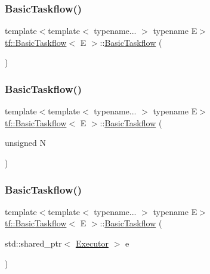 \subsubsection{\texorpdfstring{Basic\+Taskflow()}{BasicTaskflow()}\hspace{0.1cm}{\footnotesize\ttfamily [1/3]}}
{\footnotesize\ttfamily template$<$template$<$ typename... $>$ typename E$>$ \\
\hyperlink{classtf_1_1BasicTaskflow}{tf\+::\+Basic\+Taskflow}$<$ E $>$\+::\hyperlink{classtf_1_1BasicTaskflow}{Basic\+Taskflow} (\begin{DoxyParamCaption}{ }\end{DoxyParamCaption})\hspace{0.3cm}{\ttfamily [explicit]}}

\mbox{\label{classtf_1_1BasicTaskflow_a005b6e5632ad3acd52406adf7d3e84e5}} 
\subsubsection{\texorpdfstring{Basic\+Taskflow()}{BasicTaskflow()}\hspace{0.1cm}{\footnotesize\ttfamily [2/3]}}
{\footnotesize\ttfamily template$<$template$<$ typename... $>$ typename E$>$ \\
\hyperlink{classtf_1_1BasicTaskflow}{tf\+::\+Basic\+Taskflow}$<$ E $>$\+::\hyperlink{classtf_1_1BasicTaskflow}{Basic\+Taskflow} (\begin{DoxyParamCaption}\item[{unsigned}]{N }\end{DoxyParamCaption})\hspace{0.3cm}{\ttfamily [explicit]}}

\mbox{\label{classtf_1_1BasicTaskflow_aa6301c0e9667a4a0ecd30f4d654ac135}} 
\subsubsection{\texorpdfstring{Basic\+Taskflow()}{BasicTaskflow()}\hspace{0.1cm}{\footnotesize\ttfamily [3/3]}}
{\footnotesize\ttfamily template$<$template$<$ typename... $>$ typename E$>$ \\
\hyperlink{classtf_1_1BasicTaskflow}{tf\+::\+Basic\+Taskflow}$<$ E $>$\+::\hyperlink{classtf_1_1BasicTaskflow}{Basic\+Taskflow} (\begin{DoxyParamCaption}\item[{std\+::shared\+\_\+ptr$<$ \hyperlink{classtf_1_1BasicTaskflow_ab183cd063ba999ac62b5d4e9bb89247d}{Executor} $>$}]{e }\end{DoxyParamCaption})\hspace{0.3cm}{\ttfamily [explicit]}}

